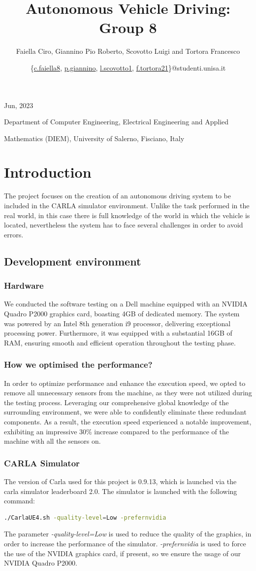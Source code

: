 \documentclass{article}
\title{\textbf{\myfont Autonomous Vehicle Driving: Group 8}}
\author{\small{Faiella Ciro, Giannino Pio Roberto, Scovotto Luigi and Tortora Francesco}}
\date{\small{\{\href{mailto:c.faiella8@studenti.unisa.it}{c.faiella8}, \href{mailto:p.giannino@studenti.unisa.it}{p.giannino}, \href{mailto:l.scovotto1@studenti.unisa.it}{l.scovotto1}, \href{mailto:f.tortora21@studenti.unisa.it}{f.tortora21}\}@studenti.unisa.it}}
\begin{document}
\maketitle
\centerline{\small{Jun, 2023}}
\centerline{Department of Computer Engineering, Electrical Engineering and Applied}
\centerline{Mathematics (DIEM), University of Salerno, Fisciano, Italy}
\newpage
\tableofcontents
\newpage
\section{Introduction}
The project focuses on the creation of an autonomous driving system to be included in the CARLA simulator 
environment. Unlike the task performed in the real world, in this case there is full knowledge of the world 
in which the vehicle is located, nevertheless the system has to face several challenges in order to avoid 
errors. 

\subsection{Development environment}
\subsubsection{Hardware}
We conducted the software testing on a Dell machine equipped with an NVIDIA Quadro P2000 graphics card, boasting 4GB of dedicated memory. 
The system was powered by an Intel 8th generation i9 processor, delivering exceptional processing power. Furthermore, it was equipped with a 
substantial 16GB of RAM, ensuring smooth and efficient operation throughout the testing phase.

\subsubsection{How we optimised the performance?}
In order to optimize performance and enhance the execution speed, we opted to remove all unnecessary sensors from the machine, 
as they were not utilized during the testing process. Leveraging our comprehensive global knowledge of the surrounding environment, 
we were able to confidently eliminate these redundant components. 
As a result, the execution speed experienced a notable improvement, exhibiting an impressive 30\% increase compared to the performance of
the machine with all the sensors on.

\subsubsection{CARLA Simulator}
The version of Carla used for this project is 0.9.13, which is launched via the carla simulator leaderboard 2.0.
The simulator is launched with the following command: 
\begin{lstlisting}[language=Bash]
    ./CarlaUE4.sh -quality-level=Low -prefernvidia
\end{lstlisting}
The parameter \textit{-quality-level=Low} is used to reduce the quality of the graphics, in order to increase the 
performance of the simulator. \textit{-prefernvidia} is used to force the use of the NVIDIA graphics card, if present, so we ensure the usage of our NVIDIA Quadro P2000.
\end{document}
